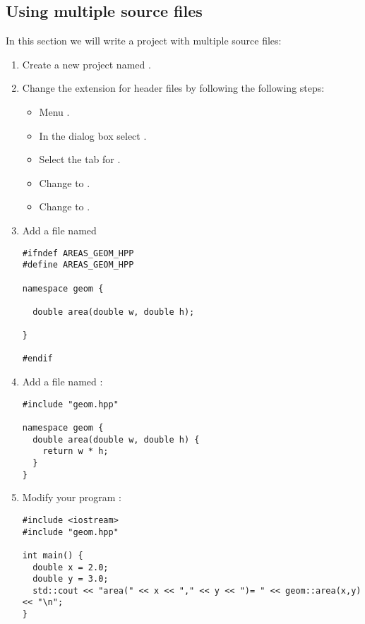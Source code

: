 \subsection{Using multiple source files}

In this section we will write a project with multiple source files:

\begin{enumerate}

\item
Create a new project named .

\item
Change the extension for header files by following the following steps:
\begin{itemize}
  \item Menu .
  \item In the dialog box select .
  \item Select the tab for .
  \item Change  to .
  \item Change  to .
\end{itemize}

\item
Add a file named 

\begin{lstlisting}
#ifndef AREAS_GEOM_HPP
#define AREAS_GEOM_HPP

namespace geom {

  double area(double w, double h);

}

#endif
\end{lstlisting}

\item 
Add a file named :

\begin{lstlisting}
#include "geom.hpp"

namespace geom {
  double area(double w, double h) {
    return w * h;
  }
}
\end{lstlisting}

\item
Modify your program :

\begin{lstlisting}
#include <iostream>
#include "geom.hpp"

int main() {
  double x = 2.0;
  double y = 3.0;
  std::cout << "area(" << x << "," << y << ")= " << geom::area(x,y) << "\n";
}
\end{lstlisting}


\end{enumerate}
